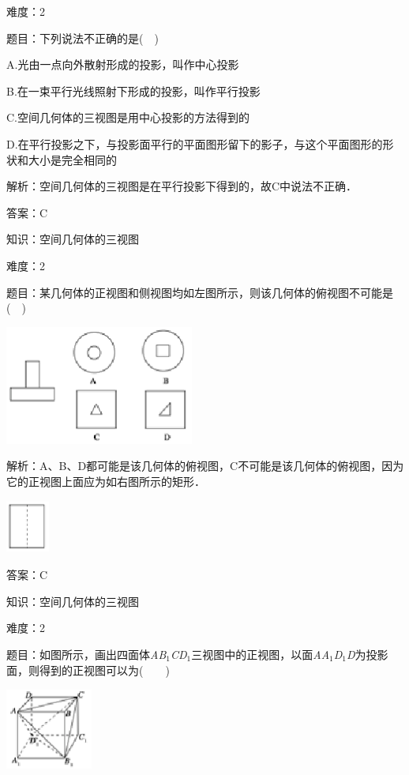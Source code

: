 \documentclass{article} %
\begin{document}
难度：2

题目：下列说法不正确的是(　)

A.光由一点向外散射形成的投影，叫作中心投影

B.在一束平行光线照射下形成的投影，叫作平行投影

C.空间几何体的三视图是用中心投影的方法得到的

D.在平行投影之下，与投影面平行的平面图形留下的影子，与这个平面图形的形状和大小是完全相同的

解析：空间几何体的三视图是在平行投影下得到的，故C中说法不正确．

答案：C


知识：空间几何体的三视图

难度：2

题目：某几何体的正视图和侧视图均如左图所示，则该几何体的俯视图不可能是(　)

\includegraphics*[width=2.45in, height=1.54in, keepaspectratio=false]{image36}

解析：A、B、D都可能是该几何体的俯视图，C不可能是该几何体的俯视图，因为它的正视图上面应为如右图所示的矩形．

\includegraphics*[width=0.56in, height=0.69in, keepaspectratio=false]{image37}

答案：C

知识：空间几何体的三视图

难度：2

题目：如图所示，画出四面体\textit{AB}${}_{1}$\textit{CD}${}_{1}$三视图中的正视图，以面\textit{AA}${}_{1}$\textit{D}${}_{1}$\textit{D}为投影面，则得到的正视图可以为(　　)

\includegraphics*[width=1.12in, height=1.06in, keepaspectratio=false]{image38}
\end{document}
